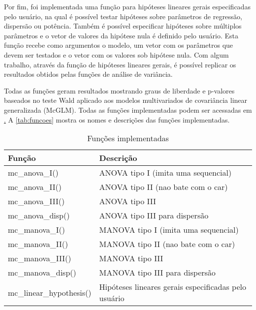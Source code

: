 Por fim, foi implementada uma função para hipóteses lineares gerais especificadas pelo usuário, na qual é possível testar hipóteses sobre parâmetros de regressão, dispersão ou potência. Também é possível especificar hipóteses sobre múltiplos parâmetros e o vetor de valores da hipótese nula é definido pelo usuário. Esta função recebe como argumentos o modelo, um vetor com os parâmetros que devem ser testados e o vetor com os valores sob hipótese nula. Com algum trabalho, através da função de hipóteses lineares gerais, é possível replicar os resultados obtidos pelas funções de análise de variância.

Todas as funções geram resultados mostrando graus de liberdade e p-valores baseados no teste Wald aplicado aos modelos multivariados de covariância linear generalizada (McGLM). Todas as funções implementadas podem ser acessadas em \href{https://github.com/lineu96/msc/}. A \autoref{tab:funcoes} mostra os nomes e descrições das funções implementadas.

\begin{table}[h]
\centering
\begin{tabular}{ll}
\hline
Função                   & Descrição                                            \\ \hline
mc\_anova\_I()           & ANOVA  tipo I   (imita uma sequencial)               \\
mc\_anova\_II()          & ANOVA  tipo II  (nao bate com o car)                 \\
mc\_anova\_III()         & ANOVA  tipo III                                      \\
mc\_anova\_disp()        & ANOVA  tipo III para dispersão                       \\
mc\_manova\_I()          & MANOVA tipo I   (imita uma sequencial)               \\
mc\_manova\_II()         & MANOVA tipo II  (nao bate com o car)                 \\
mc\_manova\_III()        & MANOVA tipo III                                      \\
mc\_manova\_disp()       & MANOVA tipo III para dispersão                       \\
mc\_linear\_hypothesis() & Hipóteses lineares gerais especificadas pelo usuário \\ \hline
\end{tabular}
\caption{Funções implementadas}
\label{tab:funcoes}
\end{table}

